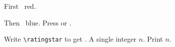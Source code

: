 \newcommand{\pdot}{}
First \pdot\ red.

\renewcommand{\pdot}{}
Then \pdot\ blue. Press  or \strButton.

Write \verb|\ratingstar| to get \ratingstar.
A single integer $n$.
Print $n$.
